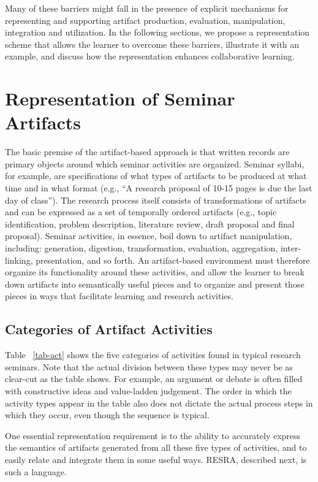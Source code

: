 Many of these barriers might fall in the presence of explicit mechanisms
for representing and supporting artifact production, evaluation,
manipulation, integration and utilization. In the following sections, we
propose a representation scheme that allows the learner to overcome these
barriers, illustrate it with an example, and discuss how the representation
enhances collaborative learning.


\section{Representation of Seminar Artifacts}

The basic premise of the artifact-based approach is that written records
are primary objects around which seminar activities are organized. Seminar
syllabi, for example, are specifications of what types of artifacts to be
produced at what time and in what format (e.g., ``A research proposal of
10-15 pages is due the last day of class''). The research process itself
consists of transformations of artifacts and can be expressed as a set of
temporally ordered artifacts (e.g., topic identification, problem
description, literature review, draft proposal and final proposal).
Seminar activities, in essence, boil down to artifact manipulation,
including: generation, digestion, transformation, evaluation, aggregation,
inter-linking, presentation, and so forth. An artifact-based environment
must therefore organize its functionality around these activities, and
allow the learner to break down artifacts into semantically useful pieces
and to organize and present those pieces in ways that facilitate learning
and research activities.


\subsection{Categories of Artifact Activities} \label{sec:activity}

Table ~\ref{tab-act} shows the five categories of activities found in
typical research seminars. Note that the actual division between these
types may never be as clear-cut as the table shows. For example, an
argument or debate is often filled with constructive ideas and value-ladden
judgement.  The order in which the activity types appear in the table also
does not dictate the actual process steps in which they occur, even though
the sequence is typical.

One essential representation requirement is to the ability to accurately
express the semantics of artifacts generated from all these five types of
activities, and to easily relate and integrate them in some useful ways.
RESRA, described next, is such a language.

